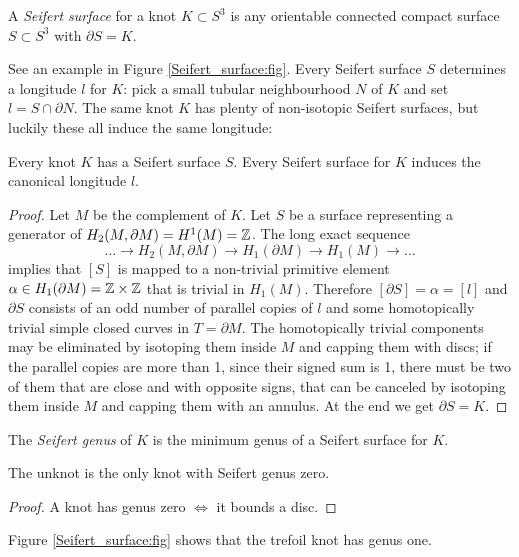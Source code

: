 \begin{defn} A \emph{Seifert surface} for a knot $K\subset S^3$ is any orientable connected compact surface $S\subset S^3$ with $\partial S = K$.
\end{defn}

See an example in Figure \ref{Seifert_surface:fig}. Every Seifert surface $S$ determines a longitude $l$ for $K$: pick a small tubular neighbourhood $N$ of $K$ and set $l=S\cap \partial N$. The same knot $K$ has plenty of non-isotopic Seifert surfaces, but luckily these all induce the same longitude:

\begin{prop}
Every knot $K$ has a Seifert surface $S$. Every Seifert surface for $K$ induces the canonical longitude $l$.
\end{prop}
\begin{proof}
Let $M$ be the complement of $K$. Let $S$ be a surface representing a generator of $H_2(M,\partial M) = H^1(M) = \mathbb{Z}$. The long exact sequence
$$\ldots \longrightarrow H_2(M,\partial M) \longrightarrow H_1(\partial M) \longrightarrow H_1(M) \longrightarrow \ldots$$ 
implies that $[S]$ is mapped to a non-trivial primitive element $\alpha \in H_1(\partial M)=\mathbb{Z}\times \mathbb{Z}$ that is trivial in $H_1(M)$. Therefore $[\partial S]=\alpha = [l]$ and $\partial S$ consists of an odd number of parallel copies of $l$ and some homotopically trivial simple closed curves in $T = \partial M$. The homotopically trivial components may be eliminated by isotoping them inside $M$ and capping them with discs; if the parallel copies are more than 1, since their signed sum is 1, there must be two of them that are close and with opposite signs, that can be canceled by isotoping them inside $M$ and capping them with an annulus. At the end we get $\partial S = K$.
\end{proof}

The \emph{Seifert genus} of $K$ is the minimum genus of a Seifert surface for $K$.

\begin{prop} The unknot is the only knot with Seifert genus zero.
\end{prop}
\begin{proof}
A knot has genus zero $\Longleftrightarrow$ it bounds a disc.
\end{proof}

Figure \ref{Seifert_surface:fig} shows that the trefoil knot has genus one.

